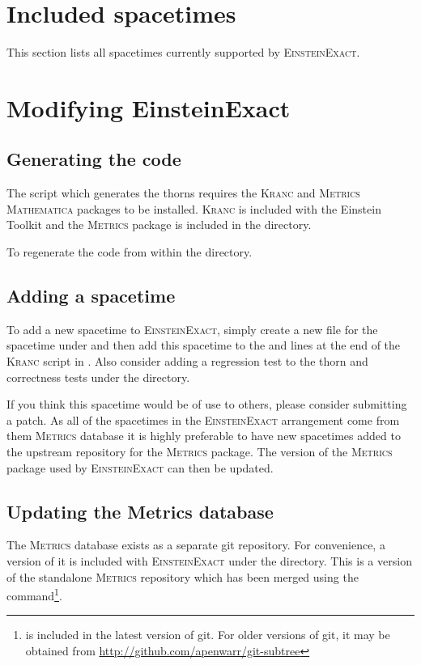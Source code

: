 \documentclass{article}
\begin{document}
\section{Included spacetimes}

This section lists all spacetimes currently supported by \textsc{EinsteinExact}.



\section{Modifying EinsteinExact}

\subsection{Generating the code}
The script which generates the thorns requires the \textsc{Kranc} and
\textsc{Metrics} \textsc{Mathematica} packages to be installed. \textsc{Kranc}
is included with the Einstein Toolkit and the \textsc{Metrics} package is
included in the  directory.

To regenerate the code  from within the  directory.

\subsection{Adding a spacetime}
To add a new spacetime to \textsc{EinsteinExact}, simply create a new file
for the spacetime under  and then add this spacetime
to the  and  lines at the end
of the \textsc{Kranc} script in . Also consider adding
a regression test to the  thorn and correctness tests
under the  directory.

If you think this spacetime would be of use to others, please consider 
submitting a patch. As all of the spacetimes in the \textsc{EinsteinExact}
arrangement come from them \textsc{Metrics} database it is highly preferable to
have new spacetimes added to the upstream repository for the \textsc{Metrics}
package. The version of the \textsc{Metrics} package used by
\textsc{EinsteinExact} can then be updated.

\subsection{Updating the Metrics database}
The \textsc{Metrics} database exists as a separate git repository. For
convenience, a version of it is included with \textsc{EinsteinExact} under
the  directory. This is a version of the standalone
\textsc{Metrics} repository which has been merged using the 
command\footnote{ is included in the latest version of git.
For older versions of git, it may be obtained from
\url{http://github.com/apenwarr/git-subtree}}.
\end{document}
